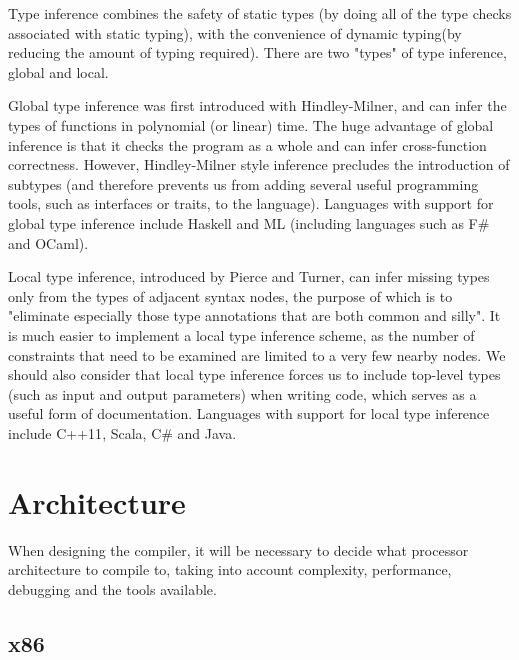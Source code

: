 \documentclass[11pt,a4paper]{report}
\begin{document}
Type inference\cite{damas-milner} combines the safety of static types\cite{palsberg199419} (by doing all of the type checks associated with static typing), with the convenience of dynamic typing\cite{Abadi:1991:DTS:103135.103138}(by reducing the amount of typing required).
There are two "types" of type inference, global and local.

Global type inference was first introduced with Hindley-Milner\cite{hindley-milner}, and can infer the types of functions in polynomial (or linear) time.
The huge advantage of global inference is that it checks the program as a whole and can infer cross-function correctness.
However, Hindley-Milner style inference precludes the introduction of subtypes\cite{Mitchell:1984:CTI:800017.800529} (and therefore prevents us from adding several useful programming tools, such as interfaces or traits, to the language).
Languages with support for global type inference include Haskell\cite{haskell-inference} and ML (including languages such as F\#\cite{fsharp-inference} and OCaml\cite{ocaml-inference}).

Local type inference, introduced by Pierce and Turner\cite{pierce1997local}, can infer missing types only from the types of adjacent syntax nodes\cite{hosoya1999good}, the purpose of which is to "eliminate especially those type annotations that are both common and silly"\cite{pierce2000local}.
It is much easier to implement a local type inference scheme, as the number of constraints that need to be examined are limited to a very few nearby nodes.
We should also consider that local type inference forces us to include top-level types (such as input and output parameters) when writing code, which serves as a useful form of documentation\cite{pierce2000local}.
Languages with support for local type inference include C++11\cite{c++11}, Scala\cite{scala-inference}, C\#\cite{csharp-inference} and Java\cite{java-inference}.

\newpage
\section{Architecture}

When designing the compiler, it will be necessary to decide what processor architecture to compile to, taking into account complexity, performance, debugging and the tools available.

\subsection{x86}
\end{document}
